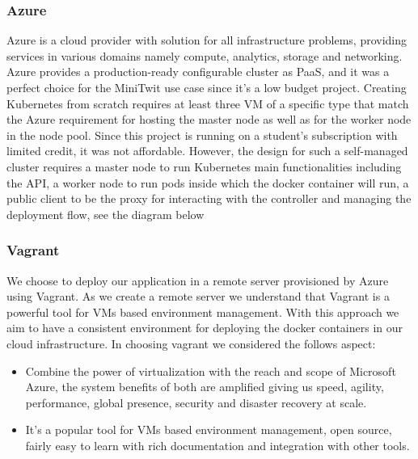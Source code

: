 \subsubsection{Azure}
Azure is a cloud provider with solution for all infrastructure problems, providing services in various domains namely compute, analytics, storage and networking. Azure provides a production-ready configurable cluster as PaaS, and it was a perfect choice for the MiniTwit use case since it's a low budget project. Creating Kubernetes from scratch requires at least three VM of a specific type that match the Azure requirement for hosting the master node as well as for the worker node in the node pool. Since this project is running on a student’s subscription with limited credit, it was not affordable. However, the design for such a self-managed cluster requires a master node to run Kubernetes main functionalities including the API, a worker node to run pods inside which the docker container will run, a public client to be the proxy for interacting with the controller and managing the deployment flow, see the diagram below

\newpage
\subsubsection{Vagrant}
We choose to deploy our application in a remote server provisioned by Azure using Vagrant. As we create a remote server we understand that Vagrant is a powerful tool for VMs based environment management. With this approach we aim to have a consistent environment for deploying the docker containers in our cloud infrastructure. In choosing vagrant we considered the follows aspect:
\begin{itemize}
    \item Combine the power of virtualization with the reach and scope of Microsoft Azure, the system benefits of both are amplified giving us speed, agility, performance, global presence, security and disaster recovery at scale.
    \item It's a popular tool for VMs based environment management, open source, fairly easy to learn with rich documentation and integration with other tools.
\end{itemize}


